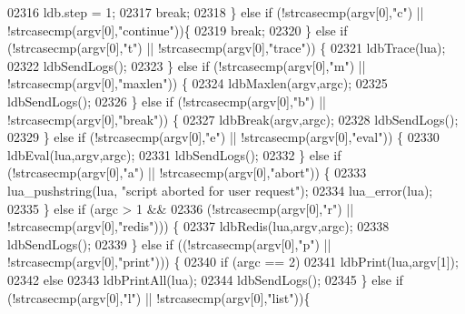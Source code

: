 \begin{DoxyCode}
{{{{{{{{{{{{{{{{{{{{{{{{02316             ldb.step = 1;
02317             \textcolor{keywordflow}{break};
02318         \} \textcolor{keywordflow}{else} \textcolor{keywordflow}{if} (!strcasecmp(argv[0],\textcolor{stringliteral}{"c"}) || !strcasecmp(argv[0],\textcolor{stringliteral}{"continue"}))\{
02319             \textcolor{keywordflow}{break};
02320         \} \textcolor{keywordflow}{else} \textcolor{keywordflow}{if} (!strcasecmp(argv[0],\textcolor{stringliteral}{"t"}) || !strcasecmp(argv[0],\textcolor{stringliteral}{"trace"})) \{
02321             ldbTrace(lua);
02322             ldbSendLogs();
02323         \} \textcolor{keywordflow}{else} \textcolor{keywordflow}{if} (!strcasecmp(argv[0],\textcolor{stringliteral}{"m"}) || !strcasecmp(argv[0],\textcolor{stringliteral}{"maxlen"})) \{
02324             ldbMaxlen(argv,argc);
02325             ldbSendLogs();
02326         \} \textcolor{keywordflow}{else} \textcolor{keywordflow}{if} (!strcasecmp(argv[0],\textcolor{stringliteral}{"b"}) || !strcasecmp(argv[0],\textcolor{stringliteral}{"break"})) \{
02327             ldbBreak(argv,argc);
02328             ldbSendLogs();
02329         \} \textcolor{keywordflow}{else} \textcolor{keywordflow}{if} (!strcasecmp(argv[0],\textcolor{stringliteral}{"e"}) || !strcasecmp(argv[0],\textcolor{stringliteral}{"eval"})) \{
02330             ldbEval(lua,argv,argc);
02331             ldbSendLogs();
02332         \} \textcolor{keywordflow}{else} \textcolor{keywordflow}{if} (!strcasecmp(argv[0],\textcolor{stringliteral}{"a"}) || !strcasecmp(argv[0],\textcolor{stringliteral}{"abort"})) \{
02333             lua\_pushstring(lua, \textcolor{stringliteral}{"script aborted for user request"});
02334             lua\_error(lua);
02335         \} \textcolor{keywordflow}{else} \textcolor{keywordflow}{if} (argc > 1 &&
02336                    (!strcasecmp(argv[0],\textcolor{stringliteral}{"r"}) || !strcasecmp(argv[0],\textcolor{stringliteral}{"redis"}))) \{
02337             ldbRedis(lua,argv,argc);
02338             ldbSendLogs();
02339         \} \textcolor{keywordflow}{else} \textcolor{keywordflow}{if} ((!strcasecmp(argv[0],\textcolor{stringliteral}{"p"}) || !strcasecmp(argv[0],\textcolor{stringliteral}{"print"}))) \{
02340             \textcolor{keywordflow}{if} (argc == 2)
02341                 ldbPrint(lua,argv[1]);
02342             \textcolor{keywordflow}{else}
02343                 ldbPrintAll(lua);
02344             ldbSendLogs();
02345         \} \textcolor{keywordflow}{else} \textcolor{keywordflow}{if} (!strcasecmp(argv[0],\textcolor{stringliteral}{"l"}) || !strcasecmp(argv[0],\textcolor{stringliteral}{"list"}))\{
}}}}}}}}}}}}}}}}}}}}}}}}
\end{DoxyCode}

